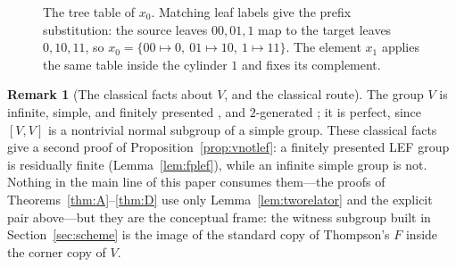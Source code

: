 \documentclass[11pt]{amsart}
\theoremstyle{definition}
\newtheorem{remark}[theorem]{Remark}
\theoremstyle{plain}
\begin{document}
\begin{figure}[t]
\centering
{}
\caption{The tree table of $x_0$.  Matching leaf labels give the prefix substitution: the source leaves $00,01,1$ map to the target leaves $0,10,11$, so $x_0=\{00\mapsto0,\ 01\mapsto10,\ 1\mapsto11\}$.  The element $x_1$ applies the same table inside the cylinder $1$ and fixes its complement.}
\label{fig:x0}
\end{figure}

\begin{remark}[The classical facts about \(V\), and the classical route]\label{rem:vclassical}
The group \(V\) is infinite, simple, and finitely presented \cite{Higman74,CannonFloydParry96}, and \(2\)-generated \cite{BleakQuick17}; it is perfect, since \([V,V]\) is a nontrivial normal subgroup of a simple group.  These classical facts give a second proof of Proposition~\ref{prop:vnotlef}: a finitely presented LEF group is residually finite (Lemma~\ref{lem:fplef}), while an infinite simple group is not.  Nothing in the main line of this paper consumes them---the proofs of Theorems~\ref{thm:A}--\ref{thm:D} use only Lemma~\ref{lem:tworelator} and the explicit pair above---but they are the conceptual frame: the witness subgroup built in Section~\ref{sec:scheme} is the image of the standard copy of Thompson's \(F\) inside the corner copy of \(V\).
\end{remark}
\end{document}
